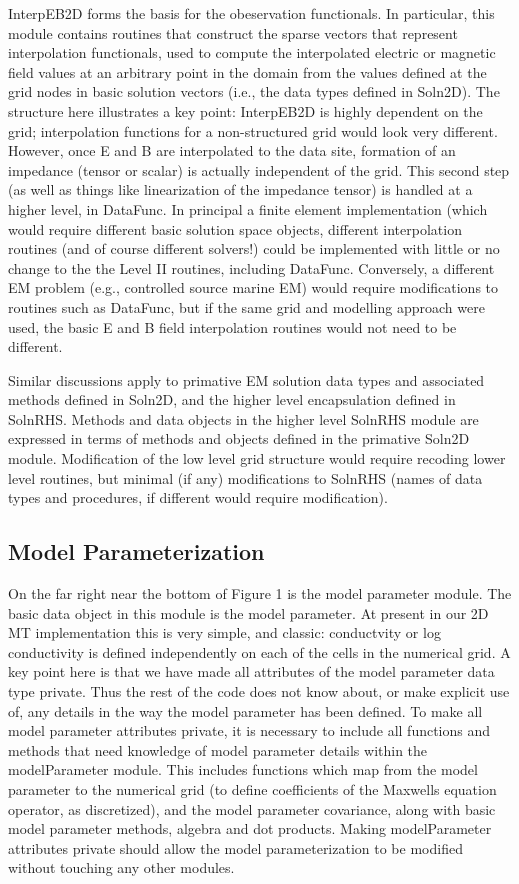 \documentclass[12pt]{article}
\begin{document}
InterpEB2D forms the basis for the obeservation functionals.  In particular,
this module contains routines that construct the sparse vectors
that represent interpolation functionals, used to compute the
interpolated electric or magnetic field values at an arbitrary
point in the domain from the values defined at the grid nodes in basic
solution vectors (i.e., the data types defined in Soln2D).  The
structure here illustrates a key point: InterpEB2D is highly dependent
on the grid; interpolation functions for a non-structured grid
would look very different.  However, once E and B are interpolated
to the data site, formation of an impedance (tensor or scalar) is
actually independent of the grid.  This second step (as well as
things like linearization of the impedance tensor) is handled at
a higher level, in DataFunc.  In principal a finite element implementation
(which would require different basic solution space objects, different
interpolation routines (and of course different solvers!) could be
implemented with little or no change to the the Level II routines,
including DataFunc.  Conversely, a different EM problem (e.g., controlled
source marine EM) would require modifications to routines such
as DataFunc, but if the same grid and modelling approach were used,
the basic E and B field interpolation routines would not need to
be different.  

Similar discussions apply to primative EM solution
data types and associated methods defined in Soln2D, and the higher
level encapsulation defined in SolnRHS.  Methods and data objects in the higher level
SolnRHS module are expressed in terms of methods and objects defined in the
primative Soln2D module.  Modification of the low level grid structure
would require recoding lower level routines, but minimal (if any)
modifications to SolnRHS (names of data types and procedures, if
different would require modification). 

\subsection{Model Parameterization}
On the far right near the bottom of Figure 1 is the model parameter module.
The basic data object in this module is the model parameter.  At
present in our 2D MT implementation this is very simple, and classic: conductvity 
or log conductivity is defined independently on each of the cells in the
numerical grid.  A key point here is that we have made all attributes
of the model parameter data type private.  Thus the rest of the
code does not know about, or make explicit use of, any details in
the way the model parameter has been defined.  To make all model
parameter attributes private, it is necessary to include all functions
and methods that need knowledge of model parameter details within
the modelParameter module.  This includes functions which map from
the model parameter to the numerical grid (to define coefficients
of the Maxwells equation operator, as discretized), and the model parameter
covariance, along with basic model parameter methods, algebra and dot
products.  Making modelParameter attributes private
should allow the model parameterization to be modified without
touching any other modules.
\end{document}
